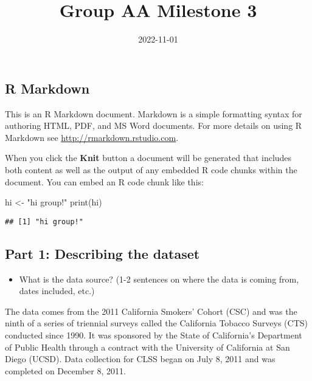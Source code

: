 \documentclass[
]{article}
\title{Group AA Milestone 3}
\author{}
\date{\vspace{-2.5em}2022-11-01}
\newenvironment{Shaded}{\begin{snugshade}}{\end{snugshade}}
\newcommand{\FunctionTok}[1]{\textcolor[rgb]{0.00,0.00,0.00}{#1}}
\newcommand{\NormalTok}[1]{#1}
\newcommand{\OtherTok}[1]{\textcolor[rgb]{0.56,0.35,0.01}{#1}}
\newcommand{\StringTok}[1]{\textcolor[rgb]{0.31,0.60,0.02}{#1}}
\providecommand{\tightlist}{%
  \setlength{\itemsep}{0pt}\setlength{\parskip}{0pt}}
\begin{document}
\maketitle

\hypertarget{r-markdown}{%
\subsection{R Markdown}\label{r-markdown}}

This is an R Markdown document. Markdown is a simple formatting syntax
for authoring HTML, PDF, and MS Word documents. For more details on
using R Markdown see \url{http://rmarkdown.rstudio.com}.

When you click the \textbf{Knit} button a document will be generated
that includes both content as well as the output of any embedded R code
chunks within the document. You can embed an R code chunk like this:

\begin{Shaded}
\begin{Highlighting}[]
\NormalTok{hi }\OtherTok{\textless{}{-}} \StringTok{"hi group!"}
\FunctionTok{print}\NormalTok{(hi)}
\end{Highlighting}
\end{Shaded}

\begin{verbatim}
## [1] "hi group!"
\end{verbatim}

\newpage

\hypertarget{part-1-describing-the-dataset}{%
\subsection{\texorpdfstring{Part 1: Describing the dataset
\n}{Part 1: Describing the dataset }}\label{part-1-describing-the-dataset}}

\begin{itemize}
\tightlist
\item
  What is the data source? (1-2 sentences on where the data is coming
  from, dates included, etc.)
\end{itemize}

The data comes from the 2011 California Smokers' Cohort (CSC) and was
the ninth of a series of triennial surveys called the California Tobacco
Surveys (CTS) conducted since 1990. It was sponsored by the State of
California's Department of Public Health through a contract with the
University of California at San Diego (UCSD). Data collection for CLSS
began on July 8, 2011 and was completed on December 8, 2011.
\end{document}
